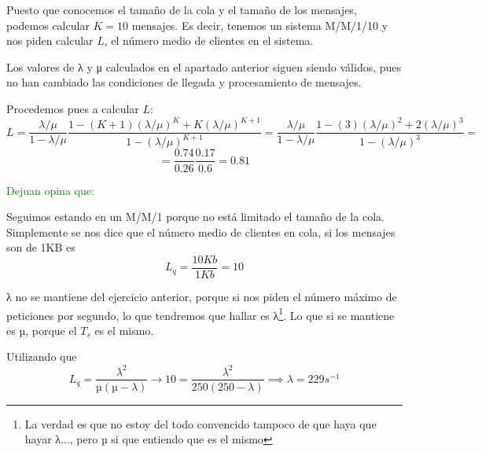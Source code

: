 \begin{problem}[6]
Puesto que conocemos el tamaño de la cola y el tamaño de los mensajes, podemos calcular $K=10$ mensajes. Es decir, tenemos un sistema M/M/1/10 y nos piden calcular $L$, el número medio de clientes en el sistema.

Los valores de λ y μ calculados en el apartado anterior siguen siendo válidos, pues no han cambiado las condiciones de llegada y procesamiento de mensajes.

Procedemos pues a calcular $L$:
\[L = \frac{λ/μ}{1-λ/μ}\frac{1-(K+1)(λ/μ)^K+K(λ/μ)^{K+1}}{1-(λ/μ)^{K+1}}=\frac{λ/μ}{1-λ/μ}\frac{1-(3)(λ/μ)^2+2(λ/μ)^{3}}{1-(λ/μ)^{3}}=\]
\[=\frac{0.74}{0.26}\frac{0.17}{0.6}=\boxed{0.81}\]

 \textcolor{green}{Dejuan opina que:}

Seguimos estando en un M/M/1 porque no está limitado el tamaño de la cola. Simplemente se nos dice que el número medio de clientes en cola, si los mensajes son de 1KB es \[L_q = \frac{10Kb}{1Kb}=10\]

λ no se mantiene del ejercicio anterior, porque si nos piden el número máximo de peticiones por segundo, lo que tendremos que hallar es λ\footnote{La verdad es que no estoy del todo convencido tampoco de que haya que hayar λ..., pero µ si que entiendo que es el mismo}. Lo que si se mantiene es µ, porque el $T_s$ es el mismo.


Utilizando que \[L_q = \frac{λ^2}{µ(µ-λ)} \to 10 = \frac{λ^2}{250(250-λ)} \implies λ=229s^{-1}\]

\end{problem}


